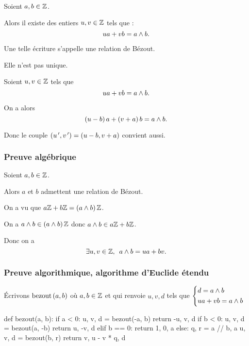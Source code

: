 \begin{defprop}
Soient \(a,b\in\mathbb{Z}\).

Alors il existe des entiers \(u,v\in\mathbb{Z}\) tels que : \[ua+vb=a\land b.\]

Une telle écriture s'appelle une relation de Bézout.

Elle n'est pas unique.
\end{defprop}

\begin{dem}
Soient \(u,v\in\mathbb{Z}\) tels que \[ua+vb=a\land b.\]

On a alors \[\left(u-b\right)a+\left(v+a\right)b=a\land b.\]

Donc le couple \(\left(u^{\,\prime},v^{\,\prime}\right)=\left(u-b,v+a\right)\) convient aussi.
\end{dem}

\subsubsection{Preuve algébrique}

\begin{prop}
Soient \(a,b\in\mathbb{Z}\).

Alors \(a\) et \(b\) admettent une relation de Bézout.
\end{prop}

\begin{dem}
On a vu que \(a\mathbb{Z}+b\mathbb{Z}=\left(a\land b\right)\mathbb{Z}\).

On a \(a\land b\in\left(a\land b\right)\mathbb{Z}\) donc \(a\land b\in a\mathbb{Z}+b\mathbb{Z}\).

Donc on a \[\quantifs{\exists u,v\in\Z}a\et b=ua+bv.\]
\end{dem}

\subsubsection{Preuve algorithmique, algorithme d'Euclide étendu}

Écrivons \(\bezout[a][b]\) où \(a,b\in\mathbb{Z}\) et qui renvoie \(u,v,d\) tels que \(\begin{dcases}d=a\land b \\ ua+vb=a\land b\end{dcases}\)

\begin{algo}
\begin{code}
def bezout(a, b):
	if a < 0:
		u, v, d = bezout(-a, b)
		return -u, v, d
	if b < 0:
		u, v, d = bezout(a, -b)
		return u, -v, d
	elif b == 0:
		return 1, 0, a
	else:
		q, r = a // b, a %
		u, v, d = bezout(b, r)
		return v, u - v * q, d
\end{code}
\end{algo}

